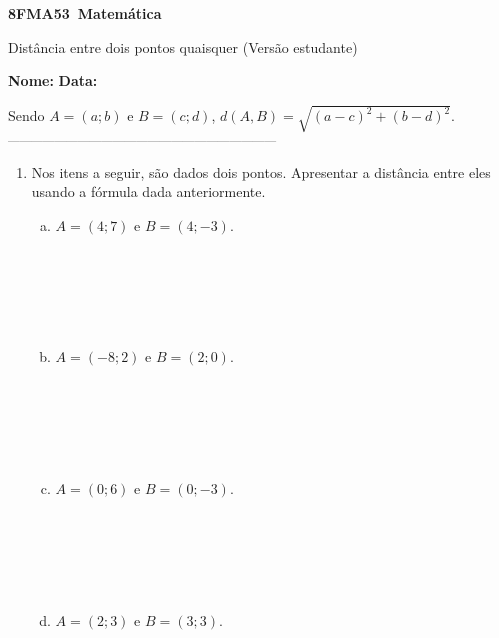 \documentclass[a4paper,14pt]{article}
\begin{document}
	
	\noindent\textbf{8FMA53~Matemática} 
	
	\begin{center}Distância entre dois pontos quaisquer (Versão estudante)
	\end{center}
	
	\noindent\textbf{Nome:} \underline{\hspace{10cm}}
	\noindent\textbf{Data:} \underline{\hspace{4cm}}
	
	
	
    \begin{multicols}{2}
    	Sendo $A = (a; b)$ e $B = (c; d)$, $d(A, B) = \sqrt{(a - c)^2 + (b - d)^2}$.\\
    	\textsubscript{---------------------------------------------------------------------}
    	\begin{enumerate}
    		\item Nos itens a seguir, são dados dois pontos. Apresentar a distância entre eles usando a fórmula dada anteriormente.
    		\begin{enumerate}[a)]
    			\item $A = (4; 7)$ e $B = (4; -3)$.\\\\\\\\\\\\
    			\item $A = (-8; 2)$ e $B = (2; 0)$.\\\\\\\\\\\\
    			\item $A = (0; 6)$ e $B = (0; -3)$.\\\\\\\\\\\\
    			\item $A = (2; 3)$ e $B = (3; 3)$.\\\\\\\\\\

\end{enumerate}
\end{enumerate}
\end{multicols}
\end{document}
